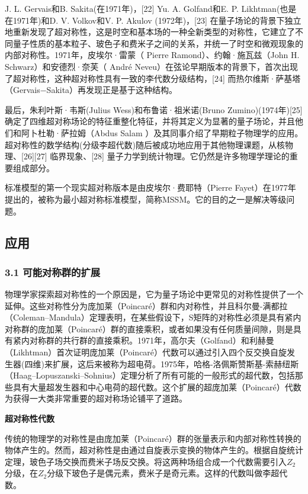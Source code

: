J. L. Gervais和B. Sakita(在1971年)，[22] Yu. A. Golfand和E. P. Likhtman(也是在1971年)和D. V. Volkov和V. P. Akulov (1972年)，[23] 在量子场论的背景下独立地重新发现了超对称性，这是时空和基本场的一种全新类型的对称性，它建立了不同量子性质的基本粒子、玻色子和费米子之间的关系，并统一了时空和微观现象的内部对称性。1971年，皮埃尔·雷蒙（ Pierre Ramond）、约翰·施瓦兹（John H. Schwarz）和安德烈·奈芙（ André Neveu）在弦论早期版本的背景下，首次出现了超对称性，这种超对称性具有一致的李代数分级结构，[24] 而热尔维斯·萨基塔（Gervais−Sakita）再发现正是基于这种结构。

最后，朱利叶斯·韦斯(Julius Wess)和布鲁诺·祖米诺(Bruno Zumino)(1974年)[25] 确定了四维超对称场论的特征重整化特征，并将其定义为显著的量子场论，并且他们和阿卜杜勒·萨拉姆（Abdus Salam ）及其同事介绍了早期粒子物理学的应用。超对称性的数学结构(分级李超代数)随后被成功地应用于其他物理课题，从核物理、[26][27] 临界现象、[28] 量子力学到统计物理。它仍然是许多物理学理论的重要组成部分。

标准模型的第一个现实超对称版本是由皮埃尔·费耶特（Pierre Fayet）在1977年提出的，被称为最小超对称标准模型，简称MSSM。它的目的之一是解决等级问题。

\subsection{应用}
\subsubsection{3.1 可能对称群的扩展}
物理学家探索超对称性的一个原因是，它为量子场论中更常见的对称性提供了一个延伸。这些对称性分为庞加莱（Poincaré）群和内对称性，并且科尔曼-满都拉（Coleman–Mandula）定理表明，在某些假设下，S矩阵的对称性必须是具有紧内对称群的庞加莱（Poincaré）群的直接乘积，或者如果没有任何质量间隙，则是具有紧内对称群的共行群的直接乘积。1971年，高尔夫（Golfand）和利赫曼（Likhtman）首次证明庞加莱（Poincaré）代数可以通过引入四个反交换自旋发生器(四维)来扩展，这后来被称为超电荷。1975年，哈格-洛佩斯赞斯基-索赫纽斯（Haag–Lopuszanski–Sohnius）定理分析了所有可能的一般形式的超代数，包括那些具有大量超发生器和中心电荷的超代数。这个扩展的超庞加莱（Poincaré）代数为获得一大类非常重要的超对称场论铺平了道路。

\textbf{超对称性代数}

传统的物理学的对称性是由庞加莱（Poincaré）群的张量表示和内部对称性转换的物体产生的。然而，超对称性是由通过自旋表示变换的物体产生的。根据自旋统计定理，玻色子场交换而费米子场反交换。将这两种场组合成一个代数需要引入$Z_2$分级，在$Z_2$分级下玻色子是偶元素，费米子是奇元素。这样的代数叫做李超代数。

